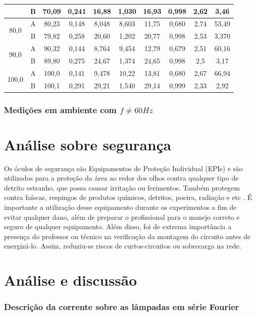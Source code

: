 \documentclass[a4paper,12pt,oneside,openany,table,xcdraw]{article}
\begin{document}
\begin{table}[H]
{\begin{tabular}{|c|c|c|c|c|c|c|c|c|c|}
 & B & 70,09 & 0,241 & 16,88 & 1,030 & 16,93 & 0,998 & 2,62 & 3,46 \\ \hline
\multirow{2}{*}{80,0} & A &  80,23 & 0,148 & 8,048 & 8,603 & 11,75 & 0,680 & 2,74 & 53,49 \\ \cline{2-10} 
 & B &  79,82 & 0,258 & 20,60 & 1,202 & 20,77 & 0,998 & 2,53 & 3,370\\ \hline
\multirow{2}{*}{90,0} & A & 90,32 & 0,144 & 8,764 & 9,454 & 12,79 & 0,679 & 2,51 & 60,16\\ \cline{2-10} 
 & B &  89,80 & 0,275 & 24,67 & 1,374 & 24,65 & 0,998 & 2,5 & 3,17 \\ \hline
\multirow{2}{*}{100,0} & A &  100,0 & 0,141 & 9,478 & 10,22 & 13,81 & 0,680 & 2,67 & 66,94 \\ \cline{2-10} 
 & B & 100,1 & 0,291 & 29,21 & 1,540 & 29,14 & 0,999 & 2,33 & 2,92\\ \hline
\end{tabular}%
}
\end{table}
\vspace{0.3cm}

\subsubsection{Medições em ambiente com $f\ne 60Hz$}

\section{Análise sobre segurança} %
Os óculos de segurança são Equipamentos de Proteção Individual (EPIs) e são utilizados para a proteção da área ao redor dos olhos contra qualquer tipo de detrito estranho, que possa causar irritação ou ferimentos. Também protegem contra faíscas, respingos de produtos químicos, detritos, poeira, radiação e etc \cite{safe}.
É importante a utilização desse equipamento durante os experimentos a fim de evitar qualquer dano, além de preparar o profissional para o manejo correto e seguro de qualquer equipamento.
Além disso, foi de extrema importância a presença do professor ou técnico na verificação da montagem do circuito antes de energizá-lo. Assim, reduziu-se riscos de curtos-circuitos ou sobrecarga na rede.

\vspace{0.2cm}
\section{Análise e discussão} %
\subsubsection{Descrição da corrente sobre as lâmpadas em série Fourier}
\end{document}
